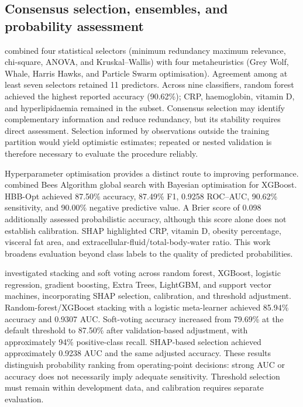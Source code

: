 \subsection{Consensus selection, ensembles, and probability assessment}
\textcite{tamer2026novel} combined four statistical selectors (minimum redundancy maximum relevance, chi-square, ANOVA, and Kruskal--Wallis) with four metaheuristics (Grey Wolf, Whale, Harris Hawks, and Particle Swarm optimisation). Agreement among at least seven selectors retained 11 predictors. Across nine classifiers, random forest achieved the highest reported accuracy (90.62\%); CRP, haemoglobin, vitamin D, and hyperlipidaemia remained in the subset. Consensus selection may identify complementary information and reduce redundancy, but its stability requires direct assessment. Selection informed by observations outside the training partition would yield optimistic estimates; repeated or nested validation is therefore necessary to evaluate the procedure reliably.

Hyperparameter optimisation provides a distinct route to improving performance. \textcite{rahman2026hbb} combined Bees Algorithm global search with Bayesian optimisation for XGBoost. HBB-Opt achieved 87.50\% accuracy, 87.49\% F1, 0.9258 ROC--AUC, 90.62\% sensitivity, and 90.00\% negative predictive value. A Brier score of 0.098 additionally assessed probabilistic accuracy, although this score alone does not establish calibration. SHAP highlighted CRP, vitamin D, obesity percentage, visceral fat area, and extracellular-fluid/total-body-water ratio. This work broadens evaluation beyond class labels to the quality of predicted probabilities.

\textcite{indirani2026ensemble} investigated stacking and soft voting across random forest, XGBoost, logistic regression, gradient boosting, Extra Trees, LightGBM, and support vector machines, incorporating SHAP selection, calibration, and threshold adjustment. Random-forest/XGBoost stacking with a logistic meta-learner achieved 85.94\% accuracy and 0.9307 AUC. Soft-voting accuracy increased from 79.69\% at the default threshold to 87.50\% after validation-based adjustment, with approximately 94\% positive-class recall. SHAP-based selection achieved approximately 0.9238 AUC and the same adjusted accuracy. These results distinguish probability ranking from operating-point decisions: strong AUC or accuracy does not necessarily imply adequate sensitivity. Threshold selection must remain within development data, and calibration requires separate evaluation.

